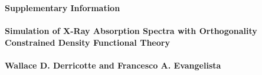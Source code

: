 \documentclass[12pt]{article}
\begin{document}
\thispagestyle{plain}
\renewcommand{\thefootnote}{\fnsymbol{footnote}}
\renewcommand\footnoterule{\vspace*{1pt}%
\hrule width 3.4in height 0.4pt \vspace*{5pt}} 
\setcounter{secnumdepth}{5}



\makeatletter 
\def\subsubsection{\@startsection{subsubsection}{3}{10pt}{-1.25ex plus -1ex minus -.1ex}{0ex plus 0ex}{\normalsize\bf}} 
\def\paragraph{\@startsection{paragraph}{4}{10pt}{-1.25ex plus -1ex minus -.1ex}{0ex plus 0ex}{\normalsize\textit}} 
\renewcommand\@biblabel[1]{#1}            
\renewcommand\@makefntext[1]%
{\noindent\makebox[0pt][r]{\@thefnmark\,}#1}
\makeatother 
\renewcommand{\figurename}{\small{Fig.}~}
\sectionfont{\large}
\subsectionfont{\normalsize} 

\fancyfoot{}
\fancyhead{}
\renewcommand{\headrulewidth}{1pt} 
\renewcommand{\footrulewidth}{1pt}
\setlength{\arrayrulewidth}{1pt}
\setlength{\columnsep}{6.5mm}
\setlength\bibsep{1pt}

\noindent\Large{\textbf{Supplementary Information\\\\
\normalsize Simulation of X-Ray Absorption Spectra with Orthogonality Constrained Density Functional Theory\\\\
Wallace D. Derricotte and Francesco A. Evangelista
}}
\vspace{0.6cm}
{\normalsize \tableofcontents}
\newpage
\vspace{0.6cm}
\end{document}
